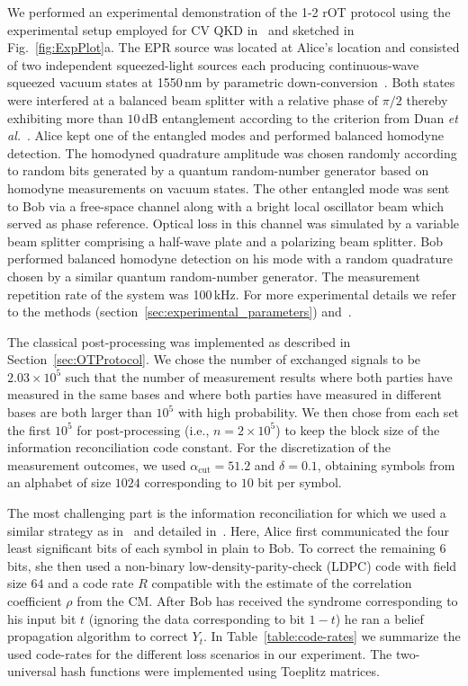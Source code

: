 \documentclass[aps,amsfonts,twoside,amssymb,superscriptaddress,twocolumn]{revtex4-1}
\begin{document}
We performed an experimental demonstration of the 1-2 rOT protocol using the experimental setup employed for CV QKD in~\cite{gehring2015CVQKD} and sketched in Fig.~\ref{fig:ExpPlot}a. 
The EPR source was located at Alice's location and consisted of two independent squeezed-light sources each producing continuous-wave squeezed vacuum states at 1550\,nm by parametric down-conversion~\cite{Eberle2013}.
Both states were interfered at a balanced beam splitter with a relative phase of $\pi/2$ thereby exhibiting more than $10$\,dB entanglement according to the criterion from Duan \emph{et al.}~\cite{Duan2000}.
Alice kept one of the entangled modes and performed balanced homodyne detection.
The homodyned quadrature amplitude was chosen randomly according to random bits generated by a quantum random-number generator based on homodyne measurements on vacuum states.
The other entangled mode was sent to Bob via a free-space channel along with a bright local oscillator beam which served as phase reference.
Optical loss in this channel was simulated by a variable beam splitter comprising a half-wave plate and a polarizing beam splitter.
Bob performed balanced homodyne detection on his mode with a random quadrature chosen by a similar quantum random-number generator. The measurement repetition rate of the system was 100\,kHz. For more experimental details we refer to the methods (section~\ref{sec:experimental_parameters}) and~\cite{gehring2015CVQKD}.

The classical post-processing was implemented as described in Section~\ref{sec:OTProtocol}. We chose the number of exchanged signals to be $2.03 \times 10^5$ such that the number of measurement results where both parties have measured in the same bases and where both parties have measured in different bases are both larger than $10^5$ with high probability. We then chose from each set the first $10^5$ for post-processing (i.e., $n=2 \times 10^5$) to keep the block size of the information reconciliation code constant. 
For the discretization of the measurement outcomes, we used $\alpha_\text{cut}=51.2$ and $\delta=0.1$, obtaining symbols from an alphabet of size $1024$ corresponding to $10$ bit per symbol. 

The most challenging part is the information reconciliation for which we used a similar strategy as in~\cite{gehring2015CVQKD} and detailed in~\cite{pacher2016}. 
Here, Alice first communicated the four least significant bits of each symbol in plain to Bob. To correct the remaining $6$ bits, she then used a non-binary low-density-parity-check (LDPC) code with field size $64$ and a code rate $R$ compatible with the estimate of the correlation coefficient $\rho$ from the CM\@. After Bob has received the syndrome corresponding to his input bit $t$ (ignoring the data corresponding to bit $1-t$) he ran a belief propagation algorithm to correct $Y_t$. In Table~\ref{table:code-rates} we summarize the used code-rates for the different loss scenarios in our experiment. The two-universal hash functions were implemented using Toeplitz matrices. 
\end{document}

